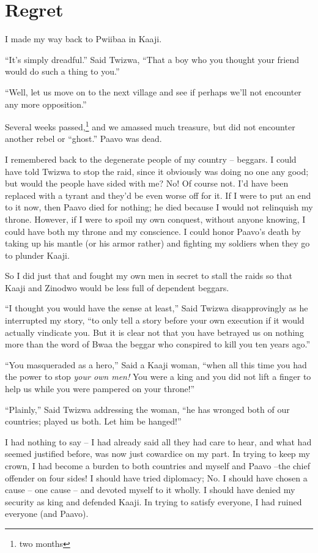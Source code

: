 \chapter{Regret}

I made my way back to Pwiibaa in Kaaji.

``It's simply dreadful.'' Said Twizwa, ``That a boy who you thought your friend would do such a thing to you.''

``Well, let us move on to the next village and see if perhaps we'll not encounter any more opposition.''

Several weeks passed,\footnote{two months} and we amassed much treasure, but did not encounter another rebel or ``ghost.'' Paavo was dead.

I remembered back to the degenerate people of my country -- beggars. I could have told Twizwa to stop the raid, since it obviously was doing no one any good; but would the people have sided with me? No! Of course not. I'd have been replaced with a tyrant and they'd be even worse off for it. If I were to put an end to it now, then Paavo died for nothing; he died because I would not relinquish my throne. However, if I were to spoil my own conquest, without anyone knowing, I could have both my throne and my conscience. I could honor Paavo's death by taking up his mantle (or his armor rather) and fighting my soldiers when they go to plunder Kaaji.

So I did just that and fought my own men in secret to stall the raids so that Kaaji and Zinodwo would be less full of dependent beggars.

\tbreak

``I thought you would have the sense at least,'' Said Twizwa disapprovingly as he interrupted my story, ``to only tell a story before your own execution if it would actually vindicate you. But it is clear not that you have betrayed us on nothing more than the word of Bwaa the beggar who conspired to kill you ten years ago.''

``You masqueraded as a hero,'' Said a Kaaji woman, ``when all this time you had the power to stop \emph{your own men!} You were a king and you did not lift a finger to help us while you were pampered on your throne!''

``Plainly,'' Said Twizwa addressing the woman, ``he has wronged both of our countries; played us both. Let him be hanged!''

I had nothing to say -- I had already said all they had care to hear, and what had seemed justified before, was now just cowardice on my part. In trying to keep my crown, I had become a burden to both countries and myself and Paavo --the chief offender on four sides! I should have tried diplomacy; No. I should have chosen a cause -- one cause -- and devoted myself to it wholly. I should have denied my security as king and defended Kaaji. In trying to satisfy everyone, I had ruined everyone (and Paavo).

